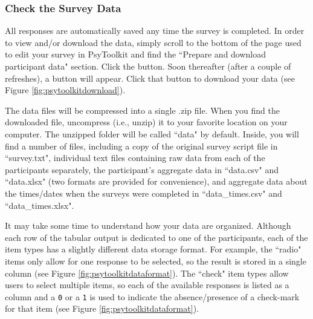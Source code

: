 \subsubsection{Check the Survey Data}
All responses are automatically saved any time the survey is completed.  In order to view and/or download the data, simply scroll to the bottom of the page used to edit your survey in PsyToolkit and find the ``Prepare and download participant data" section.  Click the  button.  Soon thereafter (after a couple of refreshes), a  button will appear.  Click that button to download your data (see Figure \ref{fig:psytoolkitdownload}).


The data files will be compressed into a single .zip file.  When you find the downloaded file, uncompress (i.e., unzip) it to your favorite location on your computer.  The unzipped folder will be called ``data" by default.  Inside, you will find a number of files, including a copy of the original survey script file in ``survey.txt", individual text files containing raw data from each of the participants separately, the participant's \gls{aggregate data} in ``data.csv" and ``data.xlsx" (two formats are provided for convenience), and aggregate data about the times/dates when the surveys were completed in ``data\_times.csv" and ``data\_times.xlsx". 

It may take some time to understand how your data are organized.  Although each row of the tabular output is dedicated to one of the participants, each of the item types has a slightly different data storage format.  For example, the ``radio" items only allow for one response to be selected, so the result is stored in a single column (see Figure \ref{fig:psytoolkitdataformat}).  The ``check" item types allow users to select multiple items, so each of the available responses is listed as a column and a \texttt{0} or a \texttt{1} is used to indicate the absence/presence of a check-mark for that item (see Figure \ref{fig:psytoolkitdataformat}).



